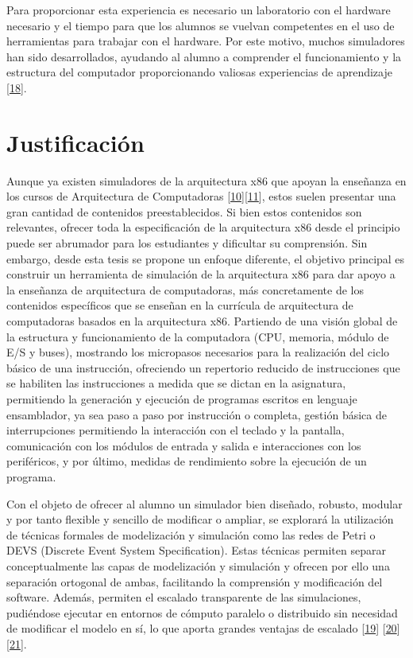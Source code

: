 \documentclass[12pt,twoside]{templates/unerthesis}
\begin{document}
Para proporcionar esta experiencia es necesario un laboratorio con el hardware necesario y el tiempo para que los alumnos se vuelvan competentes en el uso de herramientas para trabajar con el hardware. Por este motivo, muchos simuladores han sido desarrollados, ayudando al alumno a comprender el funcionamiento y la estructura del computador proporcionando valiosas experiencias de aprendizaje {[}\protect\hyperlink{ref-skrien_cpu_2001}{18}{]}.

\hypertarget{justificaciuxf3n}{%
\section{Justificación}\label{justificaciuxf3n}}

Aunque ya existen simuladores de la arquitectura x86 que apoyan la enseñanza en los cursos de Arquitectura de Computadoras {[}\protect\hyperlink{ref-radivojevic_design_2011}{10}{]}{[}\protect\hyperlink{ref-nikolic_survey_2009}{11}{]}, estos suelen presentar una gran cantidad de contenidos preestablecidos. Si bien estos contenidos son relevantes, ofrecer toda la especificación de la arquitectura x86 desde el principio puede ser abrumador para los estudiantes y dificultar su comprensión. Sin embargo, desde esta tesis se propone un enfoque diferente, el objetivo principal es construir un herramienta de simulación de la arquitectura x86 para dar apoyo a la enseñanza de arquitectura de computadoras, más concretamente de los contenidos específicos que se enseñan en la currícula de arquitectura de computadoras basados en la arquitectura x86. Partiendo de una visión global de la estructura y funcionamiento de la computadora (CPU, memoria, módulo de E/S y buses), mostrando los micropasos necesarios para la realización del ciclo básico de una instrucción, ofreciendo un repertorio reducido de instrucciones que se habiliten las instrucciones a medida que se dictan en la asignatura, permitiendo la generación y ejecución de programas escritos en lenguaje ensamblador, ya sea paso a paso por instrucción o completa, gestión básica de interrupciones permitiendo la interacción con el teclado y la pantalla, comunicación con los módulos de entrada y salida e interacciones con los periféricos, y por último, medidas de rendimiento sobre la ejecución de un programa.

Con el objeto de ofrecer al alumno un simulador bien diseñado, robusto, modular y por tanto flexible y sencillo de modificar o ampliar, se explorará la utilización de técnicas formales de modelización y simulación como las redes de Petri o DEVS (Discrete Event System Specification). Estas técnicas permiten separar conceptualmente las capas de modelización y simulación y ofrecen por ello una separación ortogonal de ambas, facilitando la comprensión y modificación del software. Además, permiten el escalado transparente de las simulaciones, pudiéndose ejecutar en entornos de cómputo paralelo o distribuido sin necesidad de modificar el modelo en sí, lo que aporta grandes ventajas de escalado {[}\protect\hyperlink{ref-peterson_petri_1981}{19}{]} {[}\protect\hyperlink{ref-zeigler_theory_2000}{20}{]}{[}\protect\hyperlink{ref-zeigler_theory_2018}{21}{]}.
\end{document}
